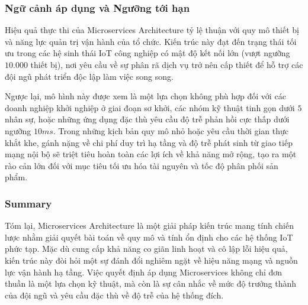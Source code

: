 \subsubsection{Ngữ cảnh áp dụng và Ngưỡng tới hạn}
Hiệu quả thực thi của Microservices Architecture tỷ lệ thuận với quy mô thiết bị và năng lực quản trị vận hành của tổ chức. Kiến trúc này đạt đến trạng thái tối ưu trong các hệ sinh thái IoT công nghiệp có mật độ kết nối lớn (vượt ngưỡng $10.000$ thiết bị), nơi yêu cầu về sự phân rã dịch vụ trở nên cấp thiết để hỗ trợ các đội ngũ phát triển độc lập làm việc song song.

Ngược lại, mô hình này được xem là một lựa chọn không phù hợp đối với các doanh nghiệp khởi nghiệp ở giai đoạn sơ khởi, các nhóm kỹ thuật tinh gọn dưới $5$ nhân sự, hoặc những ứng dụng đặc thù yêu cầu độ trễ phản hồi cực thấp dưới ngưỡng $10ms$. Trong những kịch bản quy mô nhỏ hoặc yêu cầu thời gian thực khắt khe, gánh nặng về chi phí duy trì hạ tầng và độ trễ phát sinh từ giao tiếp mạng nội bộ sẽ triệt tiêu hoàn toàn các lợi ích về khả năng mở rộng, tạo ra một rào cản lớn đối với mục tiêu tối ưu hóa tài nguyên và tốc độ phân phối sản phẩm.

\subsubsection{Summary}
Tóm lại, Microservices Architecture là một giải pháp kiến trúc mang tính chiến lược nhằm giải quyết bài toán về quy mô và tính ổn định cho các hệ thống IoT phức tạp. Mặc dù cung cấp khả năng co giãn linh hoạt và cô lập lỗi hiệu quả, kiến trúc này đòi hỏi một sự đánh đổi nghiêm ngặt về hiệu năng mạng và nguồn lực vận hành hạ tầng. Việc quyết định áp dụng Microservices không chỉ đơn thuần là một lựa chọn kỹ thuật, mà còn là sự cân nhắc về mức độ trưởng thành của đội ngũ và yêu cầu đặc thù về độ trễ của hệ thống đích.